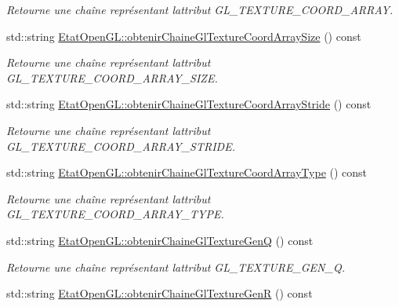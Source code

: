 \begin{DoxyCompactItemize}
\begin{DoxyCompactList}\small\item\em Retourne une chaîne représentant l\textquotesingle{}attribut G\+L\+\_\+\+T\+E\+X\+T\+U\+R\+E\+\_\+\+C\+O\+O\+R\+D\+\_\+\+A\+R\+R\+A\+Y. \end{DoxyCompactList}\item 
std\+::string \hyperlink{group__utilitaire_ga874c08bb1dab5bf56279fa496f347017}{Etat\+Open\+G\+L\+::obtenir\+Chaine\+Gl\+Texture\+Coord\+Array\+Size} () const 
\begin{DoxyCompactList}\small\item\em Retourne une chaîne représentant l\textquotesingle{}attribut G\+L\+\_\+\+T\+E\+X\+T\+U\+R\+E\+\_\+\+C\+O\+O\+R\+D\+\_\+\+A\+R\+R\+A\+Y\+\_\+\+S\+I\+Z\+E. \end{DoxyCompactList}\item 
std\+::string \hyperlink{group__utilitaire_ga0cef5f78ea9815fc83b519aff2694d5b}{Etat\+Open\+G\+L\+::obtenir\+Chaine\+Gl\+Texture\+Coord\+Array\+Stride} () const 
\begin{DoxyCompactList}\small\item\em Retourne une chaîne représentant l\textquotesingle{}attribut G\+L\+\_\+\+T\+E\+X\+T\+U\+R\+E\+\_\+\+C\+O\+O\+R\+D\+\_\+\+A\+R\+R\+A\+Y\+\_\+\+S\+T\+R\+I\+D\+E. \end{DoxyCompactList}\item 
std\+::string \hyperlink{group__utilitaire_ga6cae6d3addddcf37939f5543fffab86f}{Etat\+Open\+G\+L\+::obtenir\+Chaine\+Gl\+Texture\+Coord\+Array\+Type} () const 
\begin{DoxyCompactList}\small\item\em Retourne une chaîne représentant l\textquotesingle{}attribut G\+L\+\_\+\+T\+E\+X\+T\+U\+R\+E\+\_\+\+C\+O\+O\+R\+D\+\_\+\+A\+R\+R\+A\+Y\+\_\+\+T\+Y\+P\+E. \end{DoxyCompactList}\item 
std\+::string \hyperlink{group__utilitaire_ga2bc696d575361d0668e25ab8f8455c21}{Etat\+Open\+G\+L\+::obtenir\+Chaine\+Gl\+Texture\+Gen\+Q} () const 
\begin{DoxyCompactList}\small\item\em Retourne une chaîne représentant l\textquotesingle{}attribut G\+L\+\_\+\+T\+E\+X\+T\+U\+R\+E\+\_\+\+G\+E\+N\+\_\+\+Q. \end{DoxyCompactList}\item 
std\+::string \hyperlink{group__utilitaire_ga232ca6071605477892ccd38781f48b53}{Etat\+Open\+G\+L\+::obtenir\+Chaine\+Gl\+Texture\+Gen\+R} () const 

\end{DoxyCompactItemize}
